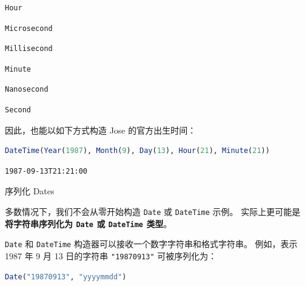 \documentclass[
  notoc %
]{tufte-book}
\makeatletter
\newcommand{\passthrough}[1]{#1}
\renewcommand\subsubsection{%
\@startsection{subsubsection}{3}{\z@ }{-3.25ex\@plus -1ex \@minus -.2ex}{1.5ex \@plus .2ex}{\normalfont \normalsize \bfseries }
}
\makeatother
\begin{document}
\begin{lstlisting}[language=Output]
Hour
\end{lstlisting}

\begin{lstlisting}[language=Output]
Microsecond
\end{lstlisting}

\begin{lstlisting}[language=Output]
Millisecond
\end{lstlisting}

\begin{lstlisting}[language=Output]
Minute
\end{lstlisting}

\begin{lstlisting}[language=Output]
Nanosecond
\end{lstlisting}

\begin{lstlisting}[language=Output]
Second
\end{lstlisting}

因此，也能以如下方式构造 Jose 的官方出生时间：

\begin{lstlisting}[language=Julia]
DateTime(Year(1987), Month(9), Day(13), Hour(21), Minute(21))
\end{lstlisting}

\begin{lstlisting}[language=Output]
1987-09-13T21:21:00
\end{lstlisting}

\hypertarget{sec:dates_parsing}{%
\subsubsection{序列化 Dates}\label{sec:dates_parsing}}

多数情况下，我们不会从零开始构造 \passthrough{\lstinline!Date!} 或
\passthrough{\lstinline!DateTime!} 示例。 实际上更可能是
\textbf{将字符串序列化为 \passthrough{\lstinline!Date!} 或
\passthrough{\lstinline!DateTime!} 类型}。

\passthrough{\lstinline!Date!} 和 \passthrough{\lstinline!DateTime!}
构造器可以接收一个数字字符串和格式字符串。 例如，表示 1987 年 9 月 13
日的字符串 \passthrough{\lstinline!"19870913"!} 可被序列化为：

\begin{lstlisting}[language=Julia]
Date("19870913", "yyyymmdd")
\end{lstlisting}
\end{document}
